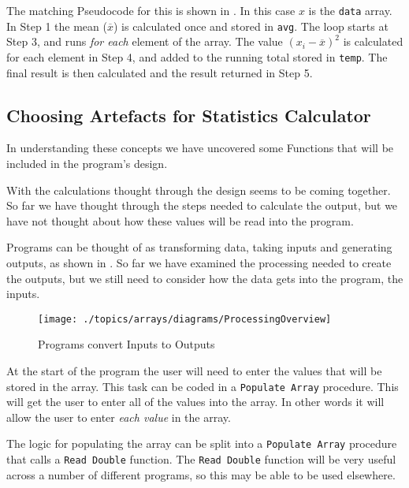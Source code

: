 The matching Pseudocode for this is shown in . In this case $x$ is the \texttt{data} array. In Step 1 the mean ($\overline{x}$) is calculated once and stored in \texttt{avg}. The loop starts at Step 3, and runs \emph{for each} element of the array. The value $(x_{i} - \overline{x})^2$ is calculated for each element in Step 4, and added to the running total stored in \texttt{temp}. The final result is then calculated and the result returned in Step 5.




\subsection{Choosing Artefacts for Statistics Calculator} %
\label{sub:choosing_artefacts_for_statistics_calculator}

In understanding these concepts we have uncovered some Functions that will be included in the program's design. 

With the calculations thought through the design seems to be coming together. So far we have thought through the steps needed to calculate the output, but we have not thought about how these values will be read into the program.

Programs can be thought of as transforming data, taking inputs and generating outputs, as shown in . So far we have examined the processing needed to create the outputs, but we still need to consider how the data gets into the program, the inputs.

\begin{figure}[h]
   \centering
   \texttt{[image: ./topics/arrays/diagrams/ProcessingOverview]} 
   \caption{Programs convert Inputs to Outputs}
   \label{fig:input-output-overview}
\end{figure}

At the start of the program the user will need to enter the values that will be stored in the array. This task can be coded in a \texttt{Populate Array} procedure. This will get the user to enter all of the values into the array. In other words it will allow the user to enter \emph{each value} in the array.

The logic for populating the array can be split into a \texttt{Populate Array} procedure that calls a \texttt{Read Double} function. The \texttt{Read Double} function will be very useful across a number of different programs, so this may be able to be used elsewhere.

